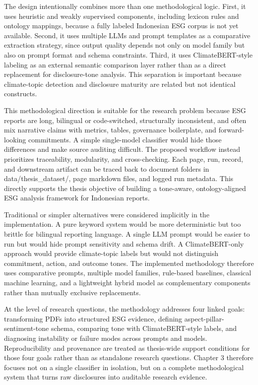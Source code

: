 \documentclass[english, online, cse, master]{dithesis}
\begin{document}
The design intentionally combines more than one methodological logic. First, it uses heuristic and weakly supervised components, including lexicon rules and ontology mappings, because a fully labeled Indonesian ESG corpus is not yet available. Second, it uses multiple LLMs and prompt templates as a comparative extraction strategy, since output quality depends not only on model family but also on prompt format and schema constraints. Third, it uses ClimateBERT-style labeling as an external semantic comparison layer rather than as a direct replacement for disclosure-tone analysis. This separation is important because climate-topic detection and disclosure maturity are related but not identical constructs.

This methodological direction is suitable for the research problem because ESG reports are long, bilingual or code-switched, structurally inconsistent, and often mix narrative claims with metrics, tables, governance boilerplate, and forward-looking commitments. A simple single-model classifier would hide those differences and make source auditing difficult. The proposed workflow instead prioritizes traceability, modularity, and cross-checking. Each page, run, record, and downstream artifact can be traced back to document folders in data/thesis\_dataset/, page markdown files, and logged run metadata. This directly supports the thesis objective of building a tone-aware, ontology-aligned ESG analysis framework for Indonesian reports.

Traditional or simpler alternatives were considered implicitly in the implementation. A pure keyword system would be more deterministic but too brittle for bilingual reporting language. A single LLM prompt would be easier to run but would hide prompt sensitivity and schema drift. A ClimateBERT-only approach would provide climate-topic labels but would not distinguish commitment, action, and outcome tones. The implemented methodology therefore uses comparative prompts, multiple model families, rule-based baselines, classical machine learning, and a lightweight hybrid model as complementary components rather than mutually exclusive replacements.

At the level of research questions, the methodology addresses four linked goals: transforming PDFs into structured ESG evidence, defining aspect-pillar-sentiment-tone schema, comparing tone with ClimateBERT-style labels, and diagnosing instability or failure modes across prompts and models. Reproducibility and provenance are treated as thesis-wide support conditions for those four goals rather than as standalone research questions. Chapter 3 therefore focuses not on a single classifier in isolation, but on a complete methodological system that turns raw disclosures into auditable research evidence.
\end{document}
